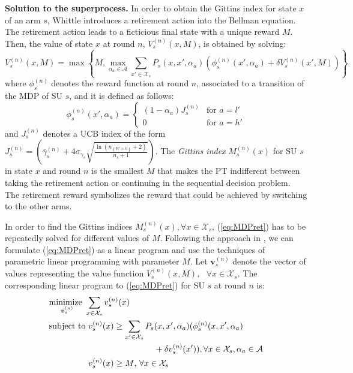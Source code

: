 \textbf{Solution to the superprocess.} In order to obtain the Gittins index for state $x$ of an arm $s$, Whittle introduces a retirement action into the Bellman equation.
The retirement action leads to a ficticious final state with a unique reward $M$. Then, the value of state $x$ at round $n$, $V_s^{(n)}(x,M)$, is obtained by solving:
\begin{equation}\label{eq:MDPret}
V_s^{(n)}(x,M) = \max\left\{M, \max_{\alpha_a \in \mathcal{A}} \sum_{x' \in \mathcal{X}_s} P_s(x,x',\alpha_a)\left(\phi_s^{(n)}(x',\alpha_a)+\delta V_s^{(n)}(x',M)\right)\right\}
\end{equation}
where $\phi_s^{(n)}$ denotes the reward function at round $n$, associated to a transition of the MDP of SU $s$, and it is defined as follows:
\begin{equation}
\phi_s^{(n)}(x',\alpha_a) = 
\begin{cases}
    (1 - \alpha_a) J_s^{(n)} & \text{for } a = l'\\
    0 & \text{for } a = h'
   \end{cases}
\end{equation}
and $J_s^{(n)}$ denotes a UCB index of the form $J_s^{(n)} = \left(\overline{\gamma}_{s}^{(n)}+4\sigma_{\gamma_s}\sqrt{\frac{\ln{(n_{\left\{W>0\right\}}+2)}}{n_s+1}}\right)$.
The \textit{Gittins index} $M_s^{(n)}(x)$ for SU $s$ in state $x$ and round $n$ is the smallest $M$ that makes the PT indifferent between taking the retirement action or continuing in the sequential decision problem. The retirement reward symbolizes the reward that could be achieved by switching to the other arms.

In order to find the Gittins indices $M_s^{(n)}(x), \forall x \in \mathcal{X}_s$, (\ref{eq:MDPret}) has to be repeatedly solved for different values of $M$. Following the approach in \cite{ref:Brown2013}, we can formulate (\ref{eq:MDPret}) as a linear program \cite{ref:Bertsekas2012} and use the techniques of parametric linear programming with parameter $M$.
Let $\boldsymbol{v}_s^{(n)}$ denote the vector of values representing the value function $V_s^{(n)}(x,M),\text{ }\forall x \in \mathcal{X}_s$. The corresponding linear program to (\ref{eq:MDPret}) for SU $s$ at round $n$ is: 
\begin{equation}
\begin{split}
  &\underset{\boldsymbol{v}_s^{(n)}}{\text{minimize }}\sum_{x \in \mathcal{X}_s} v_s^{(n)}(x)\\
  &\text{subject to }v_s^{(n)}(x) \geq \sum_{x' \in \mathcal{X}_s}  P_s(x,x',\alpha_a)(\phi_s^{(n)}(x,x',\alpha_a)\\
  &\hphantom{\text{subject to }v_s^{(n)}(x) \geq \sum_{x' \in \mathcal{X}_s} P_s}+\delta v_s^{(n)}(x')), \forall x \in \mathcal{X}_s,\alpha_a \in \mathcal{A}\\
  &\hphantom{\text{subject to }}v_s^{(n)}(x)\geq M \text{,    }\forall x \in \mathcal{X}_s
\end{split}
\end{equation}

